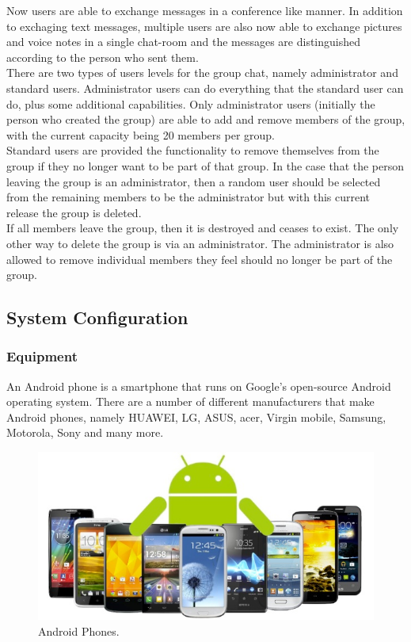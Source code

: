 \documentclass[a4paper]{article}
\begin{document}
Now users are able to exchange messages in a conference like manner. In addition to exchaging text messages, multiple users are also now able to exchange pictures and voice notes in a single chat-room and the messages are distinguished according to the person who sent them. \\

There are two types of users levels for the group chat, namely administrator and standard users. Administrator users can do everything that the standard user can do, plus some additional capabilities. Only administrator users (initially the person who created the group) are able to add and remove members of the group, with the current capacity being 20 members per group.\\

Standard users are provided the functionality to remove themselves from the group if they no longer want to be part of that group. In the case that the person leaving the group is an administrator, then a random user should be selected from the remaining members to be the administrator but with this current release the group is deleted.\\

If all members leave the group, then it is destroyed and ceases to exist. The only other way to delete the group is via an administrator. The administrator is also allowed to remove individual members they feel should no longer be part of the group.

\subsection{System Configuration}

\subsubsection{Equipment}
An Android phone is a smartphone that runs on Google's open-source Android operating system. There are a number of different manufacturers that make Android phones, namely HUAWEI, LG, ASUS, acer, Virgin mobile, Samsung, Motorola, Sony and many more.\\

\begin{center}
\begin{figure}[h]
\centering
\includegraphics[width=0.7\linewidth]{./pictures/android.jpg}
\caption{\label{fig:Agile}Android Phones.}
\end{figure}
\end{center}
\end{document}
